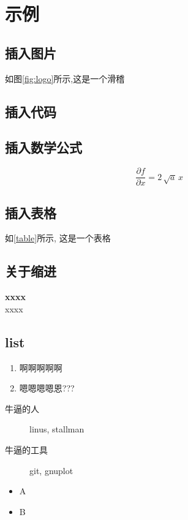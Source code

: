
\section{示例}

\subsection{插入图片}
如图\ref{fig:logo}所示,这是一个滑稽\\

\subsection{插入代码}

\subsection{插入数学公式}
$$ \frac{\partial f}{\partial x} = 2\,\sqrt{a}\,x $$

\subsection{插入表格}
如\ref{table}所示, 这是一个表格


\subsection{关于缩进}
\indent \textbf{xxxx}\\
\noindent xxxx

\subsection{list}
\begin{enumerate}
	\item  啊啊啊啊啊
	\item  嗯嗯嗯嗯恩???
\end{enumerate}
\begin{description}
  \item[牛逼的人] linus, stallman 
  \item[牛逼的工具] git, gnuplot
\end{description}
\begin{itemize}
	\item A
	\item B
\end{itemize}
